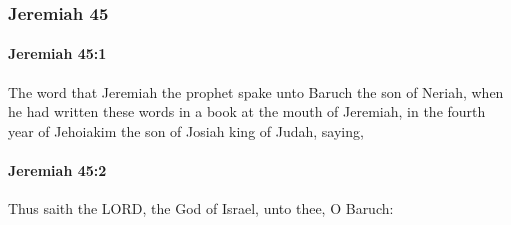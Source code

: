 	\subsubsection{Jeremiah 45} %
		\label{JEREMIAH-45}

		\paragraph{Jeremiah 45:1} %
			\label{JEREMIAH-45-1}

			The word that Jeremiah the prophet spake unto Baruch the son of Neriah, when he had written these words in a book at the mouth of Jeremiah, in the fourth year of Jehoiakim the son of Josiah king of Judah, saying,


		\paragraph{Jeremiah 45:2} %
			\label{JEREMIAH-45-2}

			Thus saith the LORD, the God of Israel, unto thee, O Baruch:

